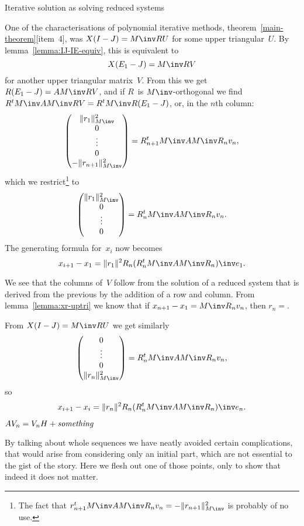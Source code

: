 \documentclass[11pt]{artikel3}
\begin{document}
\begin{Outline}
 {Iterative solution as solving reduced systems}
\FurtherReading

One of the characterisations of polynomial iterative methods,
theorem~\ref{main-theorem}[item~4], was $X(I-J)=M\inv RU$
for some upper triangular~$U$.
By lemma~\ref{lemma:IJ-IE-equiv}, this is equivalent to
    \[ X(E_1-J)=M\inv RV \] 
for another upper triangular matrix~$V$.
From this we get $R(E_1-J)=AM\inv RV$, and if $R$~is $M\inv$-orthogonal
we find $R^tM\inv AM\inv RV=R^tM\inv R(E_1-J)$, or, in the $n$th column:
    \[ \begin{pmatrix}\|r_1\|_{M\inv}^2\cr 0\cr \vdots\cr 0\cr
                -\|r_{n+1}\|_{M\inv}^2\cr\end{pmatrix} = 
        R_{n+1}^tM\inv AM\inv R_nv_n, \]
which we restrict\footnote
{The fact that $r_{n+1}^tM\inv AM\inv R_nv_n = -\|r_{n+1}\|_{M\inv}^2$
is probably of no use.} to
    \[ \begin{pmatrix}\|r_1\|_{M\inv}^2\cr 0\cr \vdots\cr 0\cr\end{pmatrix} = 
        R_n^tM\inv AM\inv R_nv_n. \]
The generating formula for~$x_i$ now becomes
\[ x_{i+1}-x_1 = \|r_1\|^2R_n (R_n^tM\inv AM\inv R_n)\inv e_1. \]

We see that the
columns of~$V$ follow from the solution of a reduced system that is
derived from the previous by the addition of a row and column.
From lemma~\ref{lemma:xr-uptri} we know that if $x_{n+1}-x_1=M\inv
R_nv_n$, then $r_n=$.

From $X(I-J)=M\inv RU$ we get similarly
    \[ \begin{pmatrix}0\cr \vdots\cr 0\cr \|r_n\|_{M\inv}^2\cr \end{pmatrix} = 
        R_n^tM\inv AM\inv R_nv_n, \]
so
\[ x_{i+1}-x_i = \|r_n\|^2R_n (R_n^tM\inv AM\inv R_n)\inv e_n. \]

 {$AV_n=V_nH+\hbox{\it something}$}
\label{sec:truncated-sequence}

By talking about whole sequences we have neatly avoided certain
complications, that would arise from considering only an initial part,
which are not essential to the gist of the story.
Here we flesh out one of those points, only to show that
indeed it does not matter.


\end{Outline}
\end{document}
